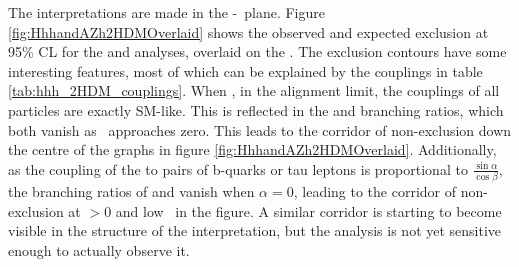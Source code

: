 The interpretations are made in the \cosba-\tanb~plane. Figure \ref{fig:HhhandAZh2HDMOverlaid}
shows the observed and expected exclusion at 95\% \ac{CL} for the \Htohh
and \AtoZh analyses, overlaid on the \xsbr.
The exclusion contours have some interesting features, most of which can be explained by the couplings
in table \ref{tab:hhh_2HDM_couplings}. When , in the alignment limit, the couplings
of all particles are exactly \ac{SM}-like. This is reflected in the \Htohh and \AtoZh branching ratios, 
which both vanish as \cosba~approaches zero. This leads to the corridor of non-exclusion down the 
centre of the graphs in figure \ref{fig:HhhandAZh2HDMOverlaid}. Additionally,
as the coupling of the \PHiggslight to pairs of b-quarks or tau leptons is proportional 
to $\frac{\sin{\alpha}}{\cos{\beta}}$, the branching ratios of \Htohhtobbtautau
and \AtoZhtolltautau vanish when $\alpha = 0$, leading to the corridor of non-exclusion
at \cosba $ > 0$ and low \tanb~in the \AtoZh figure. A similar corridor is starting
to become visible in the \xsbr structure of the \Htohh interpretation, but
the analysis is not yet sensitive enough to actually observe it.

